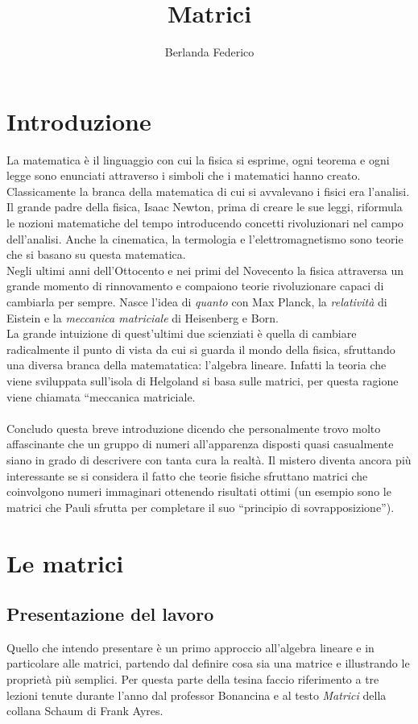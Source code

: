 \documentclass[a4paper]{article}
\title{Matrici}
\author{Berlanda Federico}
\begin{document}
\maketitle

\section{Introduzione}

La matematica è il linguaggio con cui la fisica si esprime, ogni teorema e ogni legge sono enunciati attraverso i simboli che i matematici hanno creato.
\\Classicamente la branca della matematica di cui si avvalevano i fisici era l’analisi. Il grande padre della fisica, Isaac Newton, prima di creare le sue leggi, riformula le nozioni matematiche del tempo introducendo concetti rivoluzionari nel campo dell’analisi. Anche la cinematica, la termologia e l’elettromagnetismo sono teorie che si basano su questa matematica.
\\Negli ultimi anni dell’Ottocento e nei primi del Novecento la fisica attraversa un grande momento di rinnovamento e compaiono teorie rivoluzionare capaci di cambiarla per sempre. Nasce l’idea di \textit{quanto} con Max Planck, la \textit{relatività} di Eistein e la \textit{meccanica matriciale} di Heisenberg e Born.
\\La grande intuizione di quest’ultimi due scienziati è quella di cambiare radicalmente il punto di vista da cui si guarda il mondo della fisica, sfruttando una diversa branca della matematatica: l'algebra lineare. Infatti la teoria che viene sviluppata sull’isola di Helgoland si basa sulle matrici, per questa ragione viene chiamata “meccanica matriciale.
\\
\\Concludo questa breve introduzione dicendo che personalmente trovo molto affascinante che un gruppo di numeri all'apparenza disposti quasi casualmente siano in grado di descrivere con tanta cura la realtà. Il mistero diventa ancora più interessante se si considera il fatto che teorie fisiche sfruttano matrici che coinvolgono numeri immaginari ottenendo risultati ottimi (un esempio sono le matrici che Pauli sfrutta per completare il suo “principio di sovrapposizione”).

\section{Le matrici}

\subsection{Presentazione del lavoro}
Quello che intendo presentare è un primo approccio all’algebra lineare e in particolare alle matrici, partendo dal definire cosa sia una matrice e illustrando le proprietà più semplici. Per questa parte della tesina faccio riferimento a tre lezioni tenute durante l’anno dal professor Bonancina e al testo {\it Matrici} della collana Schaum di Frank Ayres.
\end{document}
